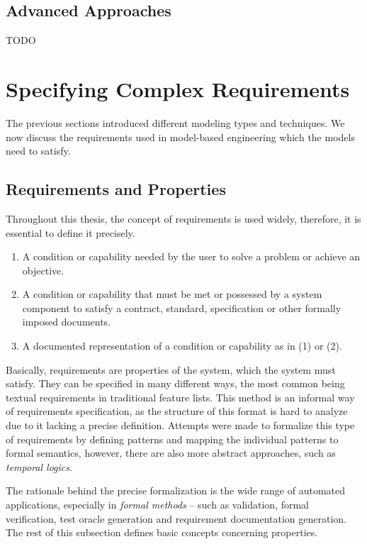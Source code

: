 \subsection{Advanced Approaches}
TODO

\section{Specifying Complex Requirements}
The previous sections introduced different modeling types and techniques. We now discuss the requirements used in model-based engineering which the models need to satisfy.

\subsection{Requirements and Properties}
Throughout this thesis, the concept of requirements is used widely, therefore, it is essential to define it precisely. 

\begin{definition}
	\mbox{}
	\begin{enumerate}
		\setlength\itemsep{0.1em}
		\item A condition or capability needed by the user to solve a problem or achieve an objective.
		\item A condition or capability that must be met or possessed by a system component to satisfy a contract, standard, specification or other formally imposed documents.
		\item A documented representation of a condition or capability as in (1) or (2).
	\end{enumerate}
\end{definition}

Basically, requirements are properties of the system, which the system must satisfy. They can be specified in many different ways, the most common being textual requirements in traditional feature lists. This method is an informal way of requirements specification, as the structure of this format is hard to analyze due to it lacking a precise definition. Attempts were made to formalize this type of requirements by defining patterns and mapping the individual patterns to formal semantics, however, there are also more abstract approaches, such as \textit{temporal logics}.

The rationale behind the precise formalization is the wide range of automated applications, especially in \textit{formal methods} -- such as validation, formal verification, test oracle generation and requirement documentation generation. The rest of this subsection defines basic concepts concerning properties.

